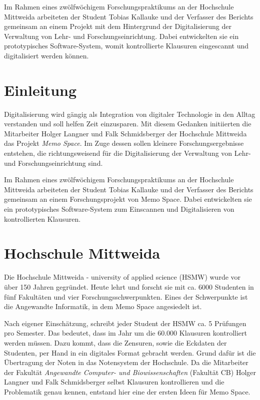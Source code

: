 \documentclass[notables, nomenclature, oneside, 150]{HSMW-Thesis}
\begin{document}
\begin{Referat}
Im Rahmen eines zwölfwöchigem Forschungspraktikums an der Hochschule Mittweida arbeiteten der Student Tobias Kallauke und der Verfasser des Berichts gemeinsam an einem Projekt mit dem Hintergrund der Digitalisierung der Verwaltung von Lehr- und Forschungseinrichtung. Dabei entwickelten sie ein prototypisches Software-System, womit kontrollierte Klausuren eingescannt und digitalisiert werden können.
\end{Referat}

\Hauptteil


\chapter{Einleitung}
	Digitalisierung wird gängig als Integration von digitaler Technologie in den Alltag verstanden und soll helfen Zeit einzusparen. Mit diesem Gedanken initiierten die Mitarbeiter Holger Langner und Falk Schmidsberger der Hochschule Mittweida das Projekt \textit{Memo Space}. Im Zuge dessen sollen kleinere Forschungsergebnisse entstehen, die richtungsweisend für die Digitalisierung der Verwaltung von Lehr- und Forschungseinrichtung sind.

	Im Rahmen eines zwölfwöchigem Forschungspraktikums an der Hochschule Mittweida arbeiteten der Student Tobias Kallauke und der Verfasser des Berichts gemeinsam an einem Forschungsprojekt von Memo Space. Dabei entwickelten sie ein prototypisches Software-System zum Einscannen und Digitalisieren von kontrollierten Klausuren.


\chapter{Hochschule Mittweida}
	Die Hochschule Mittweida - university of applied science (HSMW)  wurde vor über 150 Jahren gegründet. Heute lehrt und forscht sie mit ca. 6000 Studenten in fünf Fakultäten und vier Forschungsschwerpunkten\cite{hochschule_mittweida_hochschule_nodate}. Eines der Schwerpunkte ist die Angewandte Informatik, in dem Memo Space angesiedelt ist.
	
	Nach eigener Einschätzung, schreibt jeder Student der HSMW ca. 5 Prüfungen pro Semester. Das bedeutet, dass im Jahr um die 60.000 Klausuren kontrolliert werden müssen. Dazu kommt, dass die Zensuren, sowie die Eckdaten der Studenten, per Hand in ein digitales Format gebracht werden. Grund dafür ist die Übertragung der Noten in das Notensystem der Hochschule. Da die Mitarbeiter der Fakultät \textit{Angewandte Computer- und Biowissenschaften} (Fakultät CB) Holger Langner und Falk Schmidsberger selbst Klausuren kontrollieren und die Problematik genau kennen, entstand hier eine der ersten Ideen für Memo Space.
\end{document}
